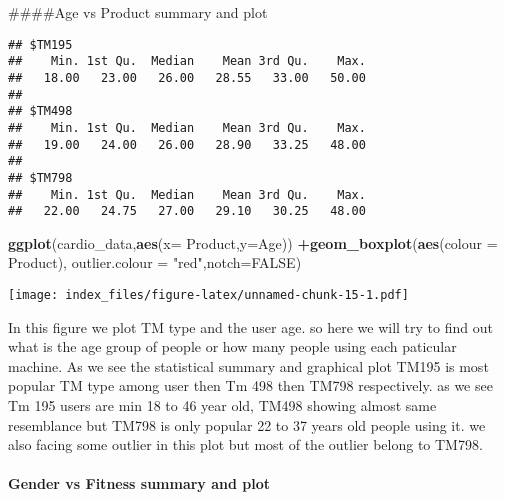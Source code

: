 \documentclass[
]{article}
\newenvironment{Shaded}{\begin{snugshade}}{\end{snugshade}}
\newcommand{\CommentTok}[1]{\textcolor[rgb]{0.56,0.35,0.01}{\textit{#1}}}
\newcommand{\DataTypeTok}[1]{\textcolor[rgb]{0.13,0.29,0.53}{#1}}
\newcommand{\KeywordTok}[1]{\textcolor[rgb]{0.13,0.29,0.53}{\textbf{#1}}}
\newcommand{\NormalTok}[1]{#1}
\newcommand{\OperatorTok}[1]{\textcolor[rgb]{0.81,0.36,0.00}{\textbf{#1}}}
\newcommand{\OtherTok}[1]{\textcolor[rgb]{0.56,0.35,0.01}{#1}}
\newcommand{\StringTok}[1]{\textcolor[rgb]{0.31,0.60,0.02}{#1}}
\begin{document}
\#\#\#\#Age vs Product summary and plot

\begin{Shaded}
\end{Shaded}

\begin{verbatim}
## $TM195
##    Min. 1st Qu.  Median    Mean 3rd Qu.    Max. 
##   18.00   23.00   26.00   28.55   33.00   50.00 
## 
## $TM498
##    Min. 1st Qu.  Median    Mean 3rd Qu.    Max. 
##   19.00   24.00   26.00   28.90   33.25   48.00 
## 
## $TM798
##    Min. 1st Qu.  Median    Mean 3rd Qu.    Max. 
##   22.00   24.75   27.00   29.10   30.25   48.00
\end{verbatim}

\begin{Shaded}
\begin{Highlighting}[]
\KeywordTok{ggplot}\NormalTok{(cardio_data,}\KeywordTok{aes}\NormalTok{(}\DataTypeTok{x=}\NormalTok{ Product,}\DataTypeTok{y=}\NormalTok{Age)) }\OperatorTok{+}\KeywordTok{geom_boxplot}\NormalTok{(}\KeywordTok{aes}\NormalTok{(}\DataTypeTok{colour =}\NormalTok{ Product), }\DataTypeTok{outlier.colour =} \StringTok{"red"}\NormalTok{,}\DataTypeTok{notch=}\OtherTok{FALSE}\NormalTok{) }
\end{Highlighting}
\end{Shaded}

\texttt{[image: index\_files/figure-latex/unnamed-chunk-15-1.pdf]}

In this figure we plot TM type and the user age. so here we will try to
find out what is the age group of people or how many people using each
paticular machine. As we see the statistical summary and graphical plot
TM195 is most popular TM type among user then Tm 498 then TM798
respectively. as we see Tm 195 users are min 18 to 46 year old, TM498
showing almost same resemblance but TM798 is only popular 22 to 37 years
old people using it. we also facing some outlier in this plot but most
of the outlier belong to TM798.

\hypertarget{gender-vs-fitness-summary-and-plot}{%
\paragraph{Gender vs Fitness summary and
plot}\label{gender-vs-fitness-summary-and-plot}}
\end{document}

